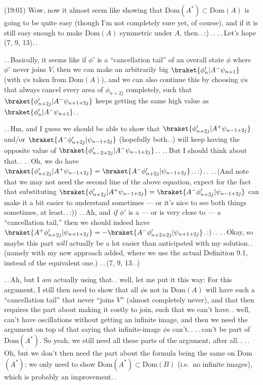 \documentclass{report}
\begin{document}
(19:01) Wow, %
now it almost seem like showing that $\mathrm{Dom}(A^*)\subset\mathrm{Dom}(A)$ is going to be quite easy (though I'm not completely sure yet, of course), and if it is still easy enough to make Dom$(A)$ symmetric under $A$, then.\,.\,:)\,.\,. .\,.\,Let's hope (7, 9, 13).\,. 

.\,.\,Basically, it seems like if $\phi'$ is a ``cancellation tail'' of an overall state $\phi$ where $\phi'$ never joins $V$, then we can make an arbitrarily big $\braket{\phi'_{n}   | A^- \psi_{n+1}}$ (with $\psi$s taken from $\mathrm{Dom}(A)$), and we can also continue this by choosing $\psi$s that always cancel every area of $\phi_{n+2j}$ completely, such that $\braket{\phi'_{n+2j}   | A^- \psi_{n+1+2j}}$ keeps getting the same high value as $\braket{\phi'_{n}   | A^- \psi_{n+1}}$.\,. %

.\,.\,Hm, and I guess we should be able to show that $\braket{\phi'_{n+2j}   | A^+ \psi_{n-1+2j}}$ and/or $\braket{A^- \phi'_{n+2j} |  \psi_{n-1+2j}}$ (hopefully both.\,.) will keep having the opposite value of $\braket{\phi'_{n-2+2j}   | A^- \psi_{n-1+2j}}$.\,. .\,.\,But I should think about that.\,. .\,.\,Oh, we do have $\braket{\phi'_{n+2j}   | A^+ \psi_{n-1+2j}} = \braket{A^- \phi'_{n+2j} |  \psi_{n-1+2j}}$.\,.\,:)\,.\,. .\,.\,(And note that we may not need the second line of the above equation, expect for the fact that substituting $\braket{\phi'_{n+2j}   | A^+ \psi_{n-1+2j}} = \braket{A^- \phi'_{n+2j} |  \psi_{n-1+2j}}$ can make it a bit easier to understand sometimes --- or it's nice to see both things sometimes, at least.\,.\,:)) .\,.\,Ah, and \emph{if} $\phi'$ is a --- or is very close to --- a ``cancellation tail,'' then we should indeed have 
$\braket{A^+ \phi'_{n+2j}   | \psi_{n+1+2j}} = - \braket{A^- \phi'_{n+2+2j} | \psi_{n+1+2j}}$.\,:)\,.\,. .\,.\,Okay, so maybe this part \emph{will} actually be a lot easier than anticipated with my solution.\,. (namely with my new approach added, where we use the actual Definition 9.1, instead of the equivalent one.) .\,.\,(7, 9, 13.\,.)

.\,.\,Ah, but I \emph{am} actually using that.\,. well, let me put it this way: For this argument, I still then need to show that all $\phi$s not in Dom$(A)$ will have such a ``cancellation tail'' that never ``joins $V$'' (almost completely never), and that then requires the part about making it costly to join, such that we can't have.\,. well, can't have oscillations without getting an infinite image, and then we need the argument on top of that saying that infinite-image $\phi$s can't.\,. .\,.\,can't be part of Dom$(A^*)$. So yeah, we still need all these parts of the argument, after all.\,. %
.\,.\,Oh, but we don't then need the part about the formula being the same on Dom$(A^*)$; we only need to show $\mathrm{Dom}(A^*)\subset\mathrm{Dom}(B)$ (i.e.\ no infinite images), which is probably an improvement.\,. %
\end{document}
